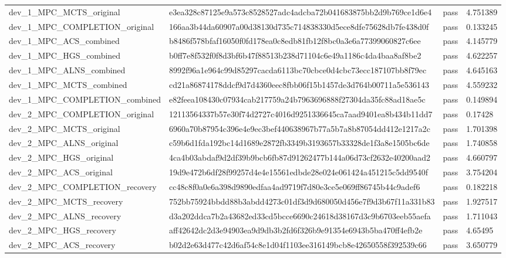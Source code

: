 \begin{tabular}{llll}
dev\_1\_MPC\_MCTS\_original & e3ea328c87125e9a573c8528527adc4adcba72b041683875bb2d9b769ce1d6e4 & pass & 4.751389 \\
dev\_1\_MPC\_COMPLETION\_original & 166aa3b44da60907a00d38130d735c714838330d5ece8dfe75628db7fe438d0f & pass & 0.133245 \\
dev\_1\_MPC\_ACS\_combined & b8486f578bfaf16050f0fd178ea0c8edb81fb12f8bc0a3e6a77399060827c6ee & pass & 4.145779 \\
dev\_1\_MPC\_HGS\_combined & b0ff7e8f532f0f8d3bf6b47f88513b238d71104c6e49a1186c4da4baa8af8be2 & pass & 4.622257 \\
dev\_1\_MPC\_ALNS\_combined & 8992f96a1e964c99d85297cacda6113bc70cbce0d4cbc73ecc187107bb8f79ec & pass & 4.645163 \\
dev\_1\_MPC\_MCTS\_combined & cd21a86874178ddcf9d7d4360eec8fbb06f15b1457de3d764b00711a5e536143 & pass & 4.559232 \\
dev\_1\_MPC\_COMPLETION\_combined & e82feea108430c07934cab217759a24b7963696888f27304da35fc88ad18ae5c & pass & 0.149894 \\
dev\_2\_MPC\_COMPLETION\_original & 12113564337b57e30f74d2727c4016d9251336645ca7aad9401ea8b434b11dd7 & pass & 0.17428 \\
dev\_2\_MPC\_MCTS\_original & 6960a70b87954c396e4e9ec3bef440638967b77a5b7a8b87054dd412e1217a2c & pass & 1.701398 \\
dev\_2\_MPC\_ALNS\_original & c59b6d1fda192bc14d1689e2872fb3349b3193657b33328de1f3a8e1505bc6de & pass & 1.740858 \\
dev\_2\_MPC\_HGS\_original & 4ca4b03abdaf9d2df39b9bcb6fb87d91262477b144a06d73cf2632e40200aad2 & pass & 4.660797 \\
dev\_2\_MPC\_ACS\_original & 19d9e472b6df28f99257d4e4e15561edbde28e024e061424a451215c5dd9540f & pass & 3.754204 \\
dev\_2\_MPC\_COMPLETION\_recovery & cc48c8f0a0e6a398d9890edfaa4ad9719f7d80e3ce5e069ff86745b44c9adef6 & pass & 0.182218 \\
dev\_2\_MPC\_MCTS\_recovery & 752bb75924bbdd88b3abdd4273c01df3d9d680050d456e7f9d3b67f11a331b83 & pass & 1.927517 \\
dev\_2\_MPC\_ALNS\_recovery & d3a202ddca7b2a43682ed33cd5bcce6690c24618d38167d3c9b6703eeb55aefa & pass & 1.711043 \\
dev\_2\_MPC\_HGS\_recovery & aff42642dc2d3e94903ea9d9db3b2fd6f326b9e91354e6943b5ba470ff4efb2e & pass & 4.65495 \\
dev\_2\_MPC\_ACS\_recovery & b02d2e63d477c42d6af54c8e1d04f1103ee316149bcb8e42650558f392539c66 & pass & 3.650779 \\

\end{tabular}

